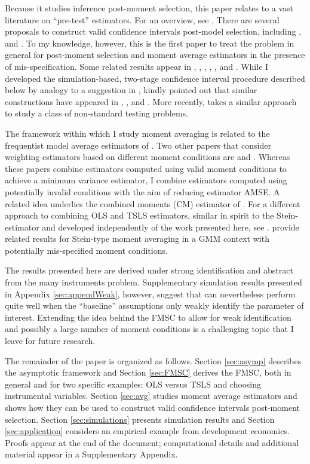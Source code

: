 Because it studies inference post-moment selection, this paper relates to a vast literature on ``pre-test'' estimators.
For an overview, see \citet{LeebPoetscher2005, LeebPoetscher2009}.
There are several proposals to construct valid confidence intervals post-model selection, including \cite{Kabaila1998}, \cite{HjortClaeskens} and \cite{KabailaLeeb2006}. 
To my knowledge, however, this is the first paper to treat the problem in general for post-moment selection and moment average estimators in the presence of mis-specification.
Some related results appear in \cite{Berkowitz2008}, \cite{Berkowitz2012}, \cite{Guggenberger2010}, \cite{Guggenberger2012}, \cite{GuggenbergerKumar}, and \cite{Caner2014}.
While I developed the simulation-based, two-stage confidence interval procedure described below by analogy to a suggestion in \cite{ClaeskensHjortbook}, \cite{Leeb} kindly pointed out that similar constructions have appeared in \cite{Loh1985}, \cite{Berger1994}, and \cite{Silvapulle1996}. More recently, \cite{McCloskey} takes a similar approach to study a class of non-standard testing problems.

The framework within which I study moment averaging is related to the frequentist model average estimators of \cite{HjortClaeskens}.
Two other papers that consider weighting estimators based on different moment conditions are \cite{Xiao} and \cite{ChenChavezLinton}.
Whereas these papers combine estimators computed using valid moment conditions to achieve a minimum variance estimator, I combine estimators computed using potentially invalid conditions with the aim of reducing estimator AMSE.
A related idea underlies the combined moments (CM) estimator of \cite{Judge2007}.
For a different approach to combining OLS and TSLS estimators, similar in spirit to the Stein-estimator and developed independently of the work presented here, see \cite{HansenStein}. 
\cite{ChengLiaoShi} provide related results for Stein-type moment averaging in a GMM context with potentially mis-specified moment conditions.

The results presented here are derived under strong identification and abstract from the many instruments problem. 
Supplementary simulation results presented in Appendix \ref{sec:appendWeak}, however, suggest that can nevertheless perform quite well when the ``baseline'' assumptions only weakly identify the parameter of interest. 
Extending the idea behind the FMSC to allow for weak identification and possibly a large number of moment conditions is a challenging topic that I leave for future research.

The remainder of the paper is organized as follows.
Section \ref{sec:asymp} describes the asymptotic framework and Section \ref{sec:FMSC} derives the FMSC, both in general and for two specific examples: OLS versus TSLS and choosing instrumental variables.
Section \ref{sec:avg} studies moment average estimators and shows how they can be used to construct valid confidence intervals post-moment selection.
Section \ref{sec:simulations} presents simulation results and Section \ref{sec:application} considers an empirical example from development economics.
Proofs appear at the end of the document; computational details and additional material appear in a Supplementary Appendix. 
